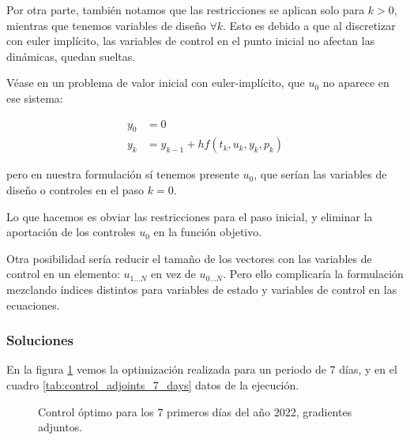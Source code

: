 Por otra parte, también notamos que las restricciones se aplican solo para
$k > 0$, mientras que tenemos variables de diseño $\forall k$. Esto es debido
a que al discretizar con euler implícito, las variables de control en el
punto inicial no afectan las dinámicas, quedan sueltas.

Véase en un problema de valor inicial con euler-implícito, que $u_0$ no aparece
en ese sistema:

\begin{align*}
	y_0 & = 0                                 \\
	y_k & = y_{k-1} + h f(t_k, u_k, y_k, p_k)
\end{align*}

pero en nuestra formulación sí tenemos presente $u_0$, que serían las variables
de diseño o controles en el paso $k=0$.

Lo que hacemos es obviar las restricciones para el paso inicial, y eliminar la
aportación de los controles $u_0$ en la función objetivo.

Otra posibilidad sería reducir el tamaño de los vectores con las variables de
control en un elemento: $u_{1 \ldots N}$ en vez de $u_{0 \ldots N}$. Pero ello
complicaría la formulación mezclando índices distintos para variables de estado
y variables de control en las ecuaciones.


\subsubsection{Soluciones}

En la figura \ref{fig:control_adjoints_7_days} vemos la optimización realizada
para un periodo de 7 días, y en el cuadro \ref{tab:control_adjoints_7_days}
datos de la ejecución.

\begin{figure}[h] \centering
	\centering
	
	\caption{Control óptimo para los 7 primeros días del año 2022, gradientes adjuntos.}
	\label{fig:control_adjoints_7_days}
\end{figure}

